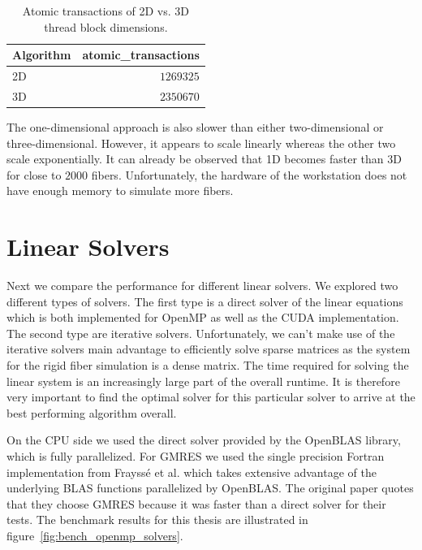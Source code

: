 \documentclass[a4paper,11pt]{kth-mag}
\begin{document}
\begin{table}[!htbp]
  \begin{center}
    \begin{tabulary}{0.7\textwidth}{LR}
      \toprule
      Algorithm & atomic\_transactions \\
      \midrule
      2D & $1269325$ \\
      3D & $2350670$ \\
      \bottomrule
    \end{tabulary}
  \end{center}
  \caption{Atomic transactions of 2D vs. 3D thread block dimensions.}
  \label{tab:atomic_transactions}
\end{table}

The one-dimensional approach is also slower than either two-dimensional or three-dimensional. However, it appears to scale linearly whereas the other two scale exponentially. It can already be observed that 1D becomes faster than 3D for close to $2000$ fibers. Unfortunately, the hardware of the workstation does not have enough memory to simulate more fibers.

\section{Linear Solvers}

Next we compare the performance for different linear solvers. We explored two different types of solvers. The first type is a direct solver of the linear equations which is both implemented for OpenMP as well as the CUDA implementation. The second type are iterative solvers. Unfortunately, we can't make use of the iterative solvers main advantage to efficiently solve sparse matrices as the system for the rigid fiber simulation is a dense matrix. The time required for solving the linear system is an increasingly large part of the overall runtime. It is therefore very important to find the optimal solver for this particular solver to arrive at the best performing algorithm overall.

On the CPU side we used the direct solver provided by the OpenBLAS library, which is fully parallelized. For GMRES we used the single precision Fortran implementation from Frayssé et al. which takes extensive advantage of the underlying BLAS functions parallelized by OpenBLAS. The original paper quotes that they choose GMRES because it was faster than a direct solver for their tests. The benchmark results for this thesis are illustrated in figure~\ref{fig:bench_openmp_solvers}.
\end{document}
